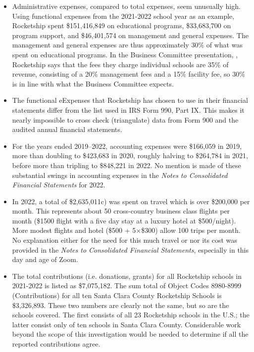\begin{itemize}
  \item Administrative expenses, compared to total expenses, seem unusually high. Using functional expenses from the 2021-2022 school year as an example, Rocketship spent \$151,416,849 on educational programs, \$33,683,700 on program support, and \$46,401,574 on management and general expenses.  The management and general expenses are thus approximately 30\% of what was spent on educational programs. In the Business Committee presentation, \textcite{Mukhopadhyay2013}, Rocketship says that the fees they charge individual schools are 35\% of revenue, consisting of a 20\% management fees and a 15\% facility fee, so 30\% is in line with what the Business Committee expects.
  \item The functional eExpenses that Rocketship has chosen to use in their financial statements differ from the list used in IRS Form 990, Part IX. This makes it nearly impossible to cross check (triangulate) data from Form 900 and the audited annual financial statements.
  \item  For the years ended 2019–2022, accounting expenses were \$166,059 in 2019, more than doubling to \$423,683 in 2020, roughly halving to \$264,784 in 2021, before more than tripling to \$848,221 in 2022. No mention is made of these substantial swings in accounting expenses in the \textit{Notes to Consolidated Financial Statements} for 2022.
  \item In 2022, a total of \$2,635,011c) was spent on travel which is over \$200,000 per month. This represents about 50 cross-country business class flights per month (\$1500 flight with a five day stay at a luxury hotel at \$500/night).  More modest flights and hotel (\$500 + 5×\$300) allow 100 trips per month.  No explanation either for the need for this much travel or nor its cost was provided in the \textit{Notes to Consolidated Financial Statements}, especially in this day and age of Zoom.
  \item The total contributions (i.e. donations, grants) for all Rocketship schools in 2021-2022 is listed as \$7,075,182. The sum total of Object Codes 8980-8999 (Contributions) for all ten Santa Clara County Rocketship Schools is \$3,326,893. These two numbers are clearly not the same, but so are the schools covered. The first consists of all 23 Rocketship schools in the U.S.; the latter consist only of ten schools in Santa Clara County. Considerable work beyond the scope of this investigation would be needed to determine if all the reported contributions agree.


\end{itemize}
